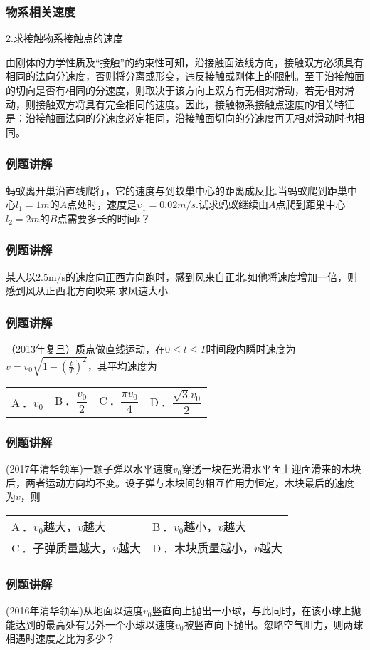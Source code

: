 \documentclass{beamer}
\newcommand{\onech}[4]{
\renewcommand\arraystretch{1.4}
\begin{tabularx}{\linewidth}{XXXX}
\setlength\tabcolsep{0pt}
A\,．#1 & B\,．#2 & C\,．#3 & D\,．#4 \\
\end{tabularx}
\unskip \unskip}
\newcommand{\twoch}[4]{
\renewcommand\arraystretch{1.4}
\begin{tabularx}{\linewidth}{XX}
\setlength\tabcolsep{0pt}
A\,．#1 & B\,．#2 \\
C\,．#3 & D\,．#4
\end{tabularx}
\unskip \unskip}
\begin{document}
    \begin{frame}
        \frametitle{物系相关速度}
    
        2.求接触物系接触点的速度

        由刚体的力学性质及“接触”的约束性可知，沿接触面法线方向，接触双方必须具有相同的法向分速度，否则将分离或形变，违反接触或刚体上的限制。至于沿接触面的切向是否有相同的分速度，则取决于该方向上双方有无相对滑动，若无相对滑动，则接触双方将具有完全相同的速度。因此，接触物系接触点速度的相关特征是：沿接触面法向的分速度必定相同，沿接触面切向的分速度再无相对滑动时也相同。
    
    \end{frame}
    \begin{frame}[t]
        \frametitle{例题讲解}
        蚂蚁离开巢沿直线爬行，它的速度与到蚁巢中心的距离成反比.当蚂蚁爬到距巢中心$l_1 
        =1m$的$A$点处时，速度是$\upsilon _1 
        =0.02m/s$.试求蚂蚁继续由$A$点爬到距巢中心$l_2 
        =2m$的$B$点需要多长的时间$t$？
        
    
    \end{frame}
    \begin{frame}[t]
        \frametitle{例题讲解}
        某人以$2.5\text{m/s}$的速度向正西方向跑时，感到风来自正北.如他将速度增加一倍，则感到风从正西北方向吹来.求风速大小.
        
    
    \end{frame}
    \begin{frame}[t]
        \frametitle{例题讲解}
        （2013年复旦）质点做直线运动，在$0\leq t\leq T$时间段内瞬时速度为$v=v_0\sqrt{1-(\frac{t}{T})^2}$，其平均速度为

        \onech{$v_0$}{$\dfrac{v_0}{2}$}{$\dfrac{\pi v_0}{4}$}{$\dfrac{\sqrt{3}v_0}{2}$}
        
    
    \end{frame}
    \begin{frame}[t]
        \frametitle{例题讲解}
        (2017年清华领军)一颗子弹以水平速度$v_0$穿透一块在光滑水平面上迎面滑来的木块后，两者运动方向均不变。设子弹与木块间的相互作用力恒定，木块最后的速度
        为$v$，则
        
        \twoch{$v_0$越大，$v$越大}{$v_0$越小，$v$越大}{子弹质量越大，$v$越大}{木块质量越小，$v$越大}
        
    
    \end{frame}
    \begin{frame}[t]
        \frametitle{例题讲解}
    
        (2016年清华领军)从地面以速度$v_0$竖直向上抛出一小球，与此同时，在该小球上抛能达到的最高处有另外一个小球以速度$v_0$被竖直向下抛出。忽略空气阻力，则两球相遇时速度之比为多少？
    
    \end{frame}
\end{document}
